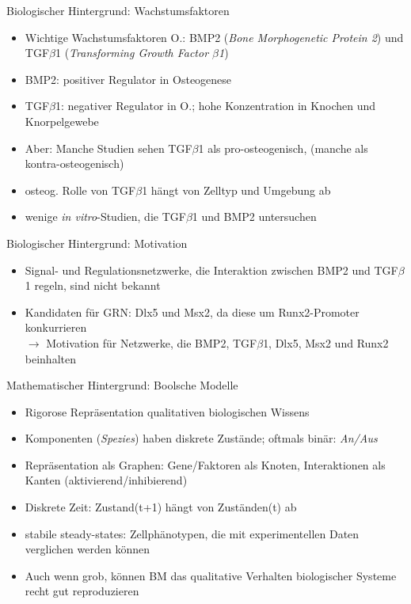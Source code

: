 \documentclass[]{beamer}
\begin{document}
\begin{frame}{Biologischer Hintergrund: Wachstumsfaktoren}
\begin{itemize}
	\item Wichtige Wachstumsfaktoren O.: BMP2 (\emph{Bone Morphogenetic Protein 2}) und TGF$\beta$1 (\emph{Transforming Growth Factor $\beta$1})
	\pause
	\item BMP2: positiver Regulator in Osteogenese
	\pause
	\item TGF$\beta$1: negativer Regulator in O.; hohe Konzentration in Knochen und Knorpelgewebe
	\pause
	\item Aber: Manche Studien sehen TGF$\beta$1 als pro-osteogenisch, (manche als kontra-osteogenisch)
	\pause
	\item osteog. Rolle von TGF$\beta$1 h\"angt von Zelltyp und Umgebung ab
	\pause
	\item wenige \emph{in vitro}-Studien, die TGF$\beta$1 und BMP2 untersuchen
\end{itemize}
\end{frame}

\begin{frame}{Biologischer Hintergrund: Motivation}
\begin{itemize}
	\item Signal- und Regulationsnetzwerke, die Interaktion zwischen BMP2 und TGF$\beta$1 regeln, sind nicht bekannt
	\pause
	\item Kandidaten f\"ur GRN: Dlx5 und Msx2, da diese um Runx2-Promoter konkurrieren
	\pause
	\\ $\rightarrow$ Motivation f\"ur Netzwerke, die BMP2, TGF$\beta$1, Dlx5, Msx2 und Runx2 beinhalten
\end{itemize}
\end{frame}

\begin{frame}{Mathematischer Hintergrund: Boolsche Modelle}
\begin{itemize}
	\item Rigorose Repr\"asentation qualitativen biologischen Wissens
	\pause
	\item Komponenten (\emph{Spezies}) haben diskrete Zust\"ande; oftmals bin\"ar: \emph{An/Aus}
	\pause
	\item Repr\"asentation als Graphen: Gene/Faktoren als Knoten, Interaktionen als Kanten (aktivierend/inhibierend)
	\pause
	\item Diskrete Zeit: Zustand(t+1) h\"angt von Zust\"anden(t) ab
	\pause
	\item stabile steady-states: Zellph\"anotypen, die mit experimentellen Daten verglichen werden k\"onnen
	\pause
	\item Auch wenn grob, k\"onnen BM das qualitative Verhalten biologischer Systeme recht gut reproduzieren
\end{itemize}
\end{frame}
\end{document}
